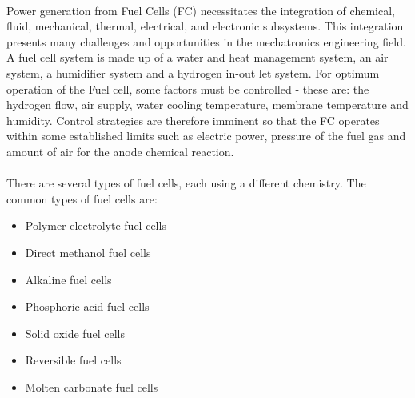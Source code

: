 \paragraph{}Power generation from Fuel Cells (FC) necessitates the integration of chemical, fluid,
mechanical, thermal, electrical, and electronic subsystems. This integration presents many
challenges and opportunities in the mechatronics engineering field. A fuel cell system is made up of a water and heat management system, an air system, a humidifier system and a hydrogen in-out let system. For optimum operation of the Fuel cell, some factors must be controlled - these are: the hydrogen flow, air supply, water cooling temperature, membrane temperature and humidity. Control strategies are therefore imminent so that the FC operates within some established limits such as electric power, pressure of the fuel gas and amount of air for the anode chemical reaction.
\paragraph{}There are several types of fuel cells, each using a different chemistry. The common types of fuel cells are:
\begin{itemize}
\item Polymer electrolyte fuel cells
\item Direct methanol fuel cells
\item Alkaline fuel cells
\item Phosphoric acid fuel cells
\item Solid oxide fuel cells
\item Reversible fuel cells
\item Molten carbonate fuel cells
\end{itemize}
